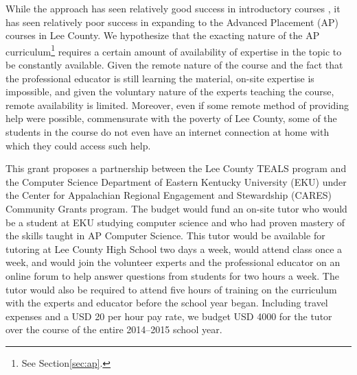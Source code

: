 While the approach has seen relatively good success in introductory courses
\autocite{WoolyWormVideo}, it has seen relatively poor success in expanding to
the Advanced Placement (AP) courses in Lee County. We hypothesize that the
exacting nature of the AP curriculum\footnote{See Section\ref{sec:ap}.}
requires a certain amount of availability
of expertise in the topic to be constantly available. Given the remote nature of
the course and the fact that the professional educator is still learning the
material, on-site expertise is impossible, and given the voluntary nature of the
experts teaching the course, remote availability is limited. Moreover, even if
some remote method of providing help were possible, commensurate with the
poverty of Lee County, some of the students in the course do not even have an
internet connection at home with which they could access such help.

This grant proposes a partnership between the Lee County TEALS program and
the Computer Science Department of Eastern Kentucky University (EKU) under the
Center for Appalachian Regional Engagement and Stewardship
(CARES) Community Grants program. The budget would fund an on-site tutor who
would be a student at EKU studying computer science and who had proven mastery
of the skills taught in AP Computer Science. This tutor would be available for
tutoring at Lee County High School two days a week, would attend class once a
week, and would join the volunteer experts and the professional educator on an
online forum to help answer questions from students for two hours a week.
The tutor would also be required to attend five hours of training on the
curriculum with the experts and educator before the school year began. Including
travel expenses and a USD 20 per hour pay rate, we budget USD 4000 for the
tutor over the course of the entire 2014--2015 school year.

